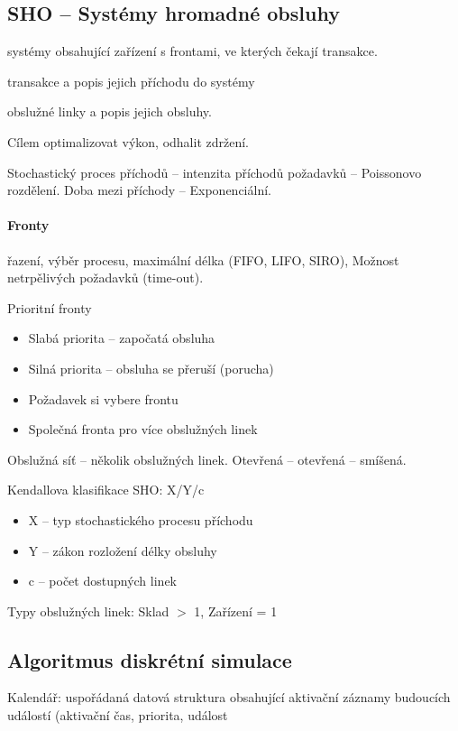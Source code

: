 \documentclass[a4paper, 11pt]{report}
\begin{document}
\subsection{SHO -- Systémy hromadné obsluhy}

systémy obsahující zařízení s frontami, ve kterých čekají transakce.

transakce a popis jejich příchodu do systémy

obslužné linky a popis jejich obsluhy.

Cílem optimalizovat výkon, odhalit zdržení. 

Stochastický proces příchodů -- intenzita příchodů požadavků -- Poissonovo rozdělení. Doba mezi příchody -- Exponenciální.

\paragraph{Fronty} řazení, výběr procesu, maximální délka (FIFO, LIFO, SIRO), Možnost netrpělivých požadavků (time-out).

Prioritní fronty
\begin{itemize}
	\item Slabá priorita -- započatá obsluha
	\item Silná priorita -- obsluha se přeruší (porucha)
	\item Požadavek si vybere frontu
	\item Společná fronta pro více obslužných linek
\end{itemize}

Obslužná síť -- několik obslužných linek. Otevřená -- otevřená -- smíšená.

Kendallova klasifikace SHO: X/Y/c
\begin{itemize}
	\item X -- typ stochastického procesu příchodu
	\item Y -- zákon rozložení délky obsluhy
	\item c -- počet dostupných linek
\end{itemize}

Typy obslužných linek: Sklad $>$ 1, Zařízení = 1

\subsection{Algoritmus diskrétní simulace}

Kalendář: uspořádaná datová struktura obsahující aktivační záznamy budoucích událostí (aktivační čas, priorita, událost
\end{document}
